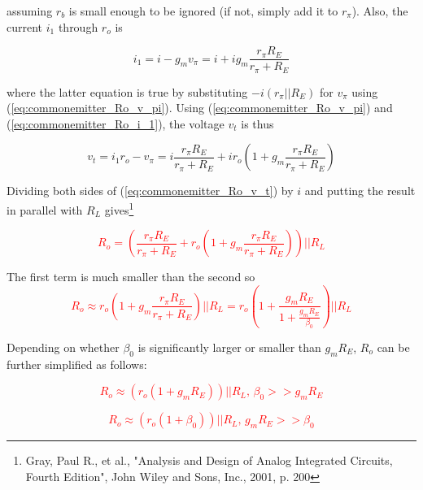 \noindent assuming $r_{b}$ is small enough to be ignored (if not, simply add it to $r_{\pi}$). Also, the current $i_{1}$ through $r_{o}$ is

\begin{equation}
i_{1} = i - g_{m}v_{\pi} = i + ig_{m}\frac{r_{\pi}R_{E}}{r_{\pi}+R_{E}}
\label{eq:commonemitter_Ro_i_1}
\end{equation}

\noindent where the latter equation is true by substituting $-i(r_{\pi}||R_{E})$ for $v_{\pi}$ using (\ref{eq:commonemitter_Ro_v_pi}). Using (\ref{eq:commonemitter_Ro_v_pi}) and (\ref{eq:commonemitter_Ro_i_1}), the voltage $v_{t}$ is thus

\begin{equation}
v_{t} = i_{1}r_{o}-v_{\pi} = i\frac{r_{\pi}R_{E}}{r_{\pi}+R_{E}} + ir_{o}\left(1+g_{m}\frac{r_{\pi}R_{E}}{r_{\pi}+R_{E}}\right)
\label{eq:commonemitter_Ro_v_t}
\end{equation}

\noindent Dividing both sides of (\ref{eq:commonemitter_Ro_v_t}) by $i$ and putting the result in parallel with $R_{L}$ gives\footnote{Gray, Paul R., et al., "Analysis and Design of Analog Integrated Circuits, Fourth Edition", John Wiley and Sons, Inc., 2001, p. 200}

\textcolor{red}{
\begin{equation}
R_{o} = \left(\frac{r_{\pi}R_{E}}{r_{\pi}+R_{E}} + r_{o}\left(1+g_{m}\frac{r_{\pi}R_{E}}{r_{\pi}+R_{E}}\right)\right) || R_{L}
\label{eq:commonemitter_Ro}
\end{equation}
}

\noindent The first term is much smaller than the second so
\textcolor{red}{
\begin{equation}
R_{o} \approx r_{o}\left(1+g_{m}\frac{r_{\pi}R_{E}}{r_{\pi}+R_{E}}\right) || R_{L} = r_{o}\left(1+\frac{g_{m}R_{E}}{1+\frac{g_{m}R_{E}}{\beta_{0}}}\right) || R_{L}
\end{equation}
}

\noindent Depending on whether $\beta_{0}$ is significantly larger or smaller than $g_{m}R_{E}$, $R_{o}$ can be further simplified as follows:

\textcolor{red}{
\begin{equation}
R_{o} \approx (r_{o}(1+g_{m}R_{E})) || R_{L}\text{, }\beta_{0} >> g_{m}R_{E}
\end{equation}
}

\textcolor{red}{
\begin{equation}
R_{o} \approx (r_{o}(1+\beta_{0})) || R_{L}\text{, }g_{m}R_{E} >> \beta_{0}
\end{equation}
}

